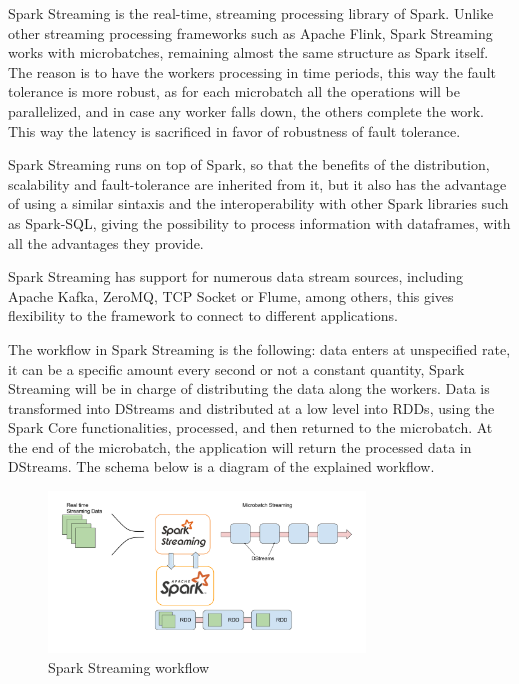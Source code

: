\documentclass[11pt]{book} %
\begin{document}
          Spark Streaming is the real-time, streaming processing library of Spark. Unlike other streaming processing frameworks such as Apache Flink, Spark Streaming works with microbatches, remaining almost the same structure as Spark itself. The reason is to have the workers processing in time periods, this way the fault tolerance is more robust, as for each microbatch all the operations will be parallelized, and in case any worker falls down, the others complete the work. This way the latency is sacrificed in favor of robustness of fault tolerance.

          Spark Streaming runs on top of Spark, so that the benefits of the distribution, scalability and fault-tolerance are inherited from it, but it also has the advantage of using a similar sintaxis and the interoperability with other Spark libraries such as Spark-SQL, giving the possibility to process information with dataframes, with all the advantages they provide.

          Spark Streaming has support for numerous data stream sources, including Apache Kafka, ZeroMQ, TCP Socket or Flume, among others, this gives flexibility to the framework to connect to different applications.

          The workflow in Spark Streaming is the following: data enters at unspecified rate, it can be a specific amount every second or not a constant quantity, Spark Streaming will be in charge of distributing the data along the workers. Data is transformed into DStreams and distributed at a low level into RDDs, using the Spark Core functionalities, processed, and then returned to the microbatch. At the end of the microbatch, the application will return the processed data in DStreams. The schema below is a diagram of the explained workflow.

          \begin{figure}[!ht]
            \centering
            \includegraphics[width=0.75\textwidth]{Spark_Streaming_architecture.png}
            \caption{Spark Streaming workflow}
            \label{img:Spark_streaming_workflow}
          \end{figure}
\end{document}
